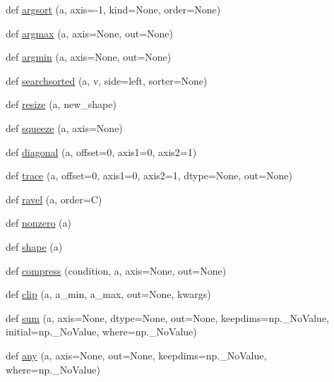 \begin{DoxyCompactItemize}
\item 
def \hyperlink{namespacenumpy_1_1core_1_1fromnumeric_afdffddb3e74b9b677f131e8896024fce}{argsort} (a, axis=-\/1, kind=None, order=None)
\item 
def \hyperlink{namespacenumpy_1_1core_1_1fromnumeric_a083371d5f8442e43fd4a713850936323}{argmax} (a, axis=None, out=None)
\item 
def \hyperlink{namespacenumpy_1_1core_1_1fromnumeric_adae8749dfce336e200e9c0f0e899dc8a}{argmin} (a, axis=None, out=None)
\item 
def \hyperlink{namespacenumpy_1_1core_1_1fromnumeric_ab6546094daae7f66978e896bd47eeb89}{searchsorted} (a, v, side=\textquotesingle{}left\textquotesingle{}, sorter=None)
\item 
def \hyperlink{namespacenumpy_1_1core_1_1fromnumeric_a305a853e726d7cac4811a5be0b72662a}{resize} (a, new\+\_\+shape)
\item 
def \hyperlink{namespacenumpy_1_1core_1_1fromnumeric_aa60aeb04e12e89a7ccba71037d1bc940}{squeeze} (a, axis=None)
\item 
def \hyperlink{namespacenumpy_1_1core_1_1fromnumeric_a86b5fcd57e33f447e00d210a4939d8d7}{diagonal} (a, offset=0, axis1=0, axis2=1)
\item 
def \hyperlink{namespacenumpy_1_1core_1_1fromnumeric_a6ebb716a5ba069db3ad26a49e1789712}{trace} (a, offset=0, axis1=0, axis2=1, dtype=None, out=None)
\item 
def \hyperlink{namespacenumpy_1_1core_1_1fromnumeric_aa305b3df2875409e87875b0614c16936}{ravel} (a, order=\textquotesingle{}C\textquotesingle{})
\item 
def \hyperlink{namespacenumpy_1_1core_1_1fromnumeric_a6f66babbc15dfab40705d3140dd386b1}{nonzero} (a)
\item 
def \hyperlink{namespacenumpy_1_1core_1_1fromnumeric_a2129ea44e0f09787c65f8cf599e8fd52}{shape} (a)
\item 
def \hyperlink{namespacenumpy_1_1core_1_1fromnumeric_a3f38b7c769becaa0407b6f02203f1bc0}{compress} (condition, a, axis=None, out=None)
\item 
def \hyperlink{namespacenumpy_1_1core_1_1fromnumeric_a7e3b09620f5b7f5234b4751a572b8535}{clip} (a, a\+\_\+min, a\+\_\+max, out=None, kwargs)
\item 
def \hyperlink{namespacenumpy_1_1core_1_1fromnumeric_a949e18b2f911fc8b1b9d76f876e4a0b7}{sum} (a, axis=None, dtype=None, out=None, keepdims=np.\+\_\+\+No\+Value, initial=np.\+\_\+\+No\+Value, where=np.\+\_\+\+No\+Value)
\item 
def \hyperlink{namespacenumpy_1_1core_1_1fromnumeric_a99de6cfe9e42f421be2a279e9d287eae}{any} (a, axis=None, out=None, keepdims=np.\+\_\+\+No\+Value, where=np.\+\_\+\+No\+Value)

\end{DoxyCompactItemize}
